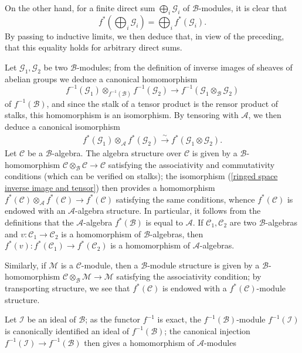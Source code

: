 On the other hand, for a finite direct sum $\bigoplus_i\mathscr{G}_i$ of $\mathscr{B}$-modules, it is clear that
\[f^*(\bigoplus_i\mathscr{G}_i)=\bigoplus_if^*(\mathscr{G}_i).\]
By passing to inductive limits, we then deduce that, in view of the preceding, that this equality holds for arbitrary direct sums.\par
Let $\mathscr{G}_1,\mathscr{G}_2$ be two $\mathscr{B}$-modules; from the definition of inverse images of sheaves of abelian groups we deduce a canonical homomorphism
\[f^{-1}(\mathscr{G}_1)\otimes_{f^{-1}(\mathscr{B})}f^{-1}(\mathscr{G}_2)\to f^{-1}(\mathscr{G}_1\otimes_{\mathscr{B}}\mathscr{G}_2)\]
of $f^{-1}(\mathscr{B})$, and since the stalk of a tensor product is the rensor product of stalks, this homomorphism is an isomorphism. By tensoring with $\mathscr{A}$, we then deduce a canonical isomorphism 
\begin{align}\label{ringed space inverse image and tensor}
f^*(\mathscr{G}_1)\otimes_{\mathscr{A}}f^*(\mathscr{G}_2)\stackrel{\sim}{\to}f^*(\mathscr{G}_1\otimes\mathscr{G}_2).
\end{align}
Let $\mathscr{C}$ be a $\mathscr{B}$-algebra. The algebra structure over $\mathscr{C}$ is given by a $\mathscr{B}$-homomorphism $\mathscr{C}\otimes_{\mathscr{B}}\mathscr{C}\to\mathscr{C}$ satisfying the associativity and commutativity conditions (which can be verified on stalks); the isomorphism (\ref{ringed space inverse image and tensor}) then provides a homomorphism $f^*(\mathscr{C})\otimes_{\mathscr{A}}f^*(\mathscr{C})\to f^*(\mathscr{C})$ satisfying the same conditions, whence $f^*(\mathscr{C})$ is endowed with an $\mathscr{A}$-algebra structure. In particular, it follows from the definitions that the $\mathscr{A}$-algebra $f^*(\mathscr{B})$ is equal to $\mathscr{A}$. If $\mathscr{C}_1,\mathscr{C}_2$ are two $\mathscr{B}$-algebras and $v:\mathscr{C}_1\to\mathscr{C}_2$ is a homomorphism of $\mathscr{B}$-algebras, then $f^*(v):f^*(\mathscr{C}_1)\to f^*(\mathscr{C}_2)$ is a homomorphism of $\mathscr{A}$-algebras.\par
Similarly, if $\mathscr{M}$ is a $\mathscr{C}$-module, then a $\mathscr{B}$-module structure is given by a $\mathscr{B}$-homomorphism $\mathscr{C}\otimes_{\mathscr{B}}\mathscr{M}\to\mathscr{M}$ satisfying the associativity condition; by transporting structure, we see that $f^*(\mathscr{C})$ is endowed with a $f^*(\mathscr{C})$-module structure.\par
Let $\mathscr{I}$ be an ideal of $\mathscr{B}$; as the functor $f^{-1}$ is exact, the $f^{-1}(\mathscr{B})$-module $f^{-1}(\mathscr{I})$ is canonically identified an ideal of $f^{-1}(\mathscr{B})$; the canonical injection $f^{-1}(\mathscr{I})\to f^{-1}(\mathscr{B})$ then gives a homomorphism of $\mathscr{A}$-modules
